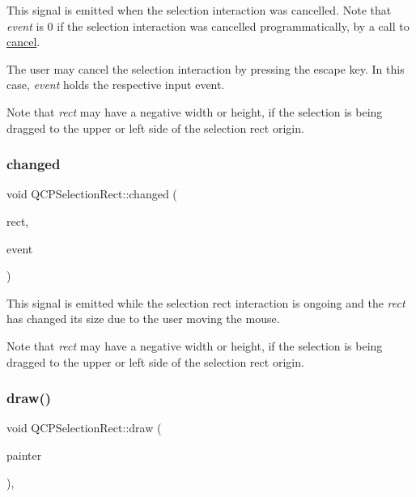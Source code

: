 This signal is emitted when the selection interaction was cancelled. Note that {\itshape event} is 0 if the selection interaction was cancelled programmatically, by a call to \mbox{\hyperlink{class_q_c_p_selection_rect_af67bc58f4f5ce9a4dc420b9c42de235a}{cancel}}.

The user may cancel the selection interaction by pressing the escape key. In this case, {\itshape event} holds the respective input event.

Note that {\itshape rect} may have a negative width or height, if the selection is being dragged to the upper or left side of the selection rect origin. \mbox{\label{class_q_c_p_selection_rect_a1bab11026bca52740c2e6682623e6964}} 
\subsubsection{\texorpdfstring{changed}{changed}}
{\footnotesize\ttfamily void Q\+C\+P\+Selection\+Rect\+::changed (\begin{DoxyParamCaption}\item[{const Q\+Rect \&}]{rect,  }\item[{Q\+Mouse\+Event $\ast$}]{event }\end{DoxyParamCaption})\hspace{0.3cm}{\ttfamily [signal]}}

This signal is emitted while the selection rect interaction is ongoing and the {\itshape rect} has changed its size due to the user moving the mouse.

Note that {\itshape rect} may have a negative width or height, if the selection is being dragged to the upper or left side of the selection rect origin. \mbox{\label{class_q_c_p_selection_rect_ab0e50ae796508bdcd97ab8c335c593bf}} 
\subsubsection{\texorpdfstring{draw()}{draw()}}
{\footnotesize\ttfamily void Q\+C\+P\+Selection\+Rect\+::draw (\begin{DoxyParamCaption}\item[{\mbox{\hyperlink{class_q_c_p_painter}{Q\+C\+P\+Painter}} $\ast$}]{painter }\end{DoxyParamCaption})\hspace{0.3cm}{\ttfamily [protected]}, {\ttfamily [virtual]}}



